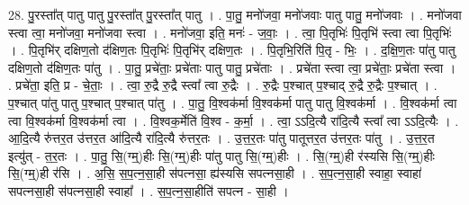 \documentclass[17pt]{extarticle}
\begin{document}
28. पु॒रस्ता᳚त् पातु पातु पु॒रस्ता᳚त् पु॒रस्ता᳚त् पातु । . पा॒तु॒ मनो॑जवा॒ मनो॑जवाः पातु पातु॒ मनो॑जवाः । . मनो॑जवा स्त्वा त्वा॒ मनो॑जवा॒ मनो॑जवा स्त्वा । . मनो॑जवा॒ इति॒ मनः॑ - ज॒वाः॒ । . त्वा॒ पि॒तृभिः॑ पि॒तृभि॑ स्त्वा त्वा पि॒तृभिः॑ । . पि॒तृभि॑र् दक्षिण॒तो द॑क्षिण॒तः पि॒तृभिः॑ पि॒तृभि॑र् दक्षिण॒तः । . पि॒तृभि॒रिति॑ पि॒तृ - भिः॒ । . द॒क्षि॒ण॒तः पा॑तु पातु दक्षिण॒तो द॑क्षिण॒तः पा॑तु । . पा॒तु॒ प्रचे॑ताः॒ प्रचे॑ताः पातु पातु॒ प्रचे॑ताः । . प्रचे॑ता स्त्वा त्वा॒ प्रचे॑ताः॒ प्रचे॑ता स्त्वा । . प्रचे॑ता॒ इति॒ प्र - चे॒ताः॒ । . त्वा॒ रु॒द्रै रु॒द्रै स्त्वा᳚ त्वा रु॒द्रैः । . रु॒द्रैः प॒श्चात् प॒श्चाद् रु॒द्रै रु॒द्रैः प॒श्चात् । . प॒श्चात् पा॑तु पातु प॒श्चात् प॒श्चात् पा॑तु । . पा॒तु॒ वि॒श्वक॑र्मा वि॒श्वक॑र्मा पातु पातु वि॒श्वक॑र्मा । . वि॒श्वक॑र्मा त्वा त्वा वि॒श्वक॑र्मा वि॒श्वक॑र्मा त्वा । . वि॒श्वक॒र्मेति॑ वि॒श्व - क॒र्मा॒ । . त्वा॒ ऽऽदि॒त्यै रा॑दि॒त्यै स्त्वा᳚ त्वा ऽऽदि॒त्यैः । . आ॒दि॒त्यै रु॑त्तर॒त उ॑त्तर॒त आ॑दि॒त्यै रा॑दि॒त्यै रु॑त्तर॒तः । . उ॒त्त॒र॒तः पा॑तु पातूत्तर॒त उ॑त्तर॒तः पा॑तु । . उ॒त्त॒र॒त इत्यु॑त् - त॒र॒तः । . पा॒तु॒ सि॒(ग्म्॒)हीः सि॒(ग्म्॒)हीः पा॑तु पातु सि॒(ग्म्॒)हीः । . सि॒(ग्म्॒)ही र॑स्यसि सि॒(ग्म्॒)हीः सि॒(ग्म्॒)ही र॑सि । . अ॒सि॒ स॒प॒त्न॒सा॒ही स॑पत्नसा॒ ह्य॑स्यसि सपत्नसा॒ही । . स॒प॒त्न॒सा॒ही स्वाहा॒ स्वाहा॑ सपत्नसा॒ही स॑पत्नसा॒ही स्वाहा᳚ । . स॒प॒त्न॒सा॒हीति॑ सपत्न - सा॒ही । \newline
\end{document}
